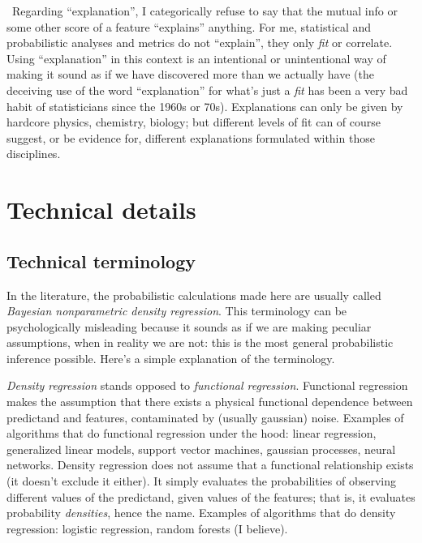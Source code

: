 \documentclass[\ifafour a4paper,12pt,\else a5paper,10pt,\fi%
onecolumn,oneside,article,%
british%
]{memoir}
\theoremstyle{remark}
\theoremstyle{innote}
\renewcommand*{\|}[1][]{\nonscript\:#1\vert\nonscript\:\mathopen{}}
\begin{document}
\medskip


\noindent\textbullet\ Regarding \enquote{explanation}, I categorically refuse to say that the
mutual info or some other score of a feature \enquote{explains} anything.
For me, statistical and probabilistic analyses and metrics do not
\enquote{explain}, they only \emph{fit} or correlate. Using
\enquote{explanation} in this context is an intentional or unintentional
way of making it sound as if we have discovered more than we actually have
(the deceiving use of the word \enquote{explanation} for what's just a
\emph{fit} has been a very bad habit of statisticians since the 1960s or
70s). Explanations can only be given by hardcore physics, chemistry,
biology; but different levels of fit can of course suggest, or be evidence
for, different explanations formulated within those disciplines.


\section{Technical details}
\label{sec:techdet}

\subsection{Technical terminology}
\label{sec:terminology}

In the literature, the probabilistic calculations made here are usually
called \emph{Bayesian nonparametric density regression}. This terminology
can be psychologically misleading because it sounds as if we are making
peculiar assumptions, when in reality we are not: this is the most general
probabilistic inference possible. Here's a simple explanation of the
terminology.

\emph{Density regression} stands opposed to \emph{functional regression}.
Functional regression makes the assumption that there exists a physical
functional dependence between predictand and features, contaminated by
(usually gaussian) noise. Examples of algorithms that do functional
regression under the hood: linear regression, generalized linear models,
support vector machines, gaussian processes, neural networks. Density
regression does not assume that a functional relationship exists (it
doesn't exclude it either). It simply evaluates the probabilities of
observing different values of the predictand, given values of the features;
that is, it evaluates  probability \emph{densities}, hence the name.
Examples of algorithms that do density regression: logistic regression,
random forests (I believe).
\end{document}
